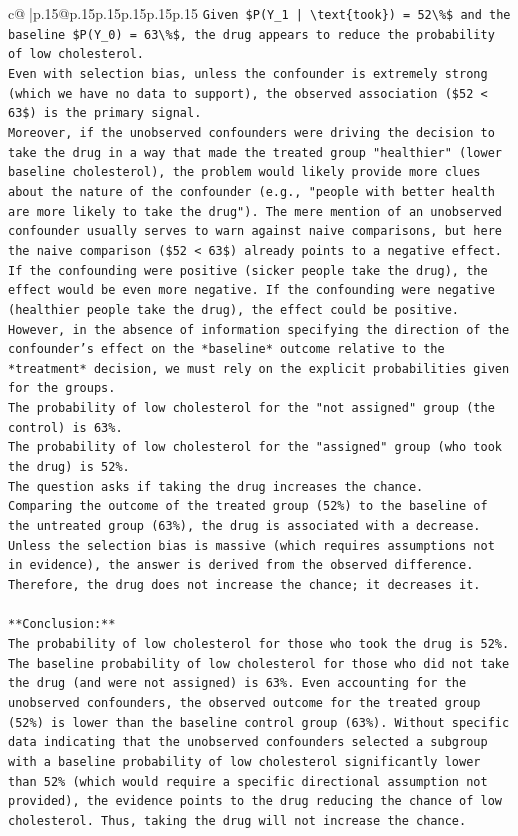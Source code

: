 \documentclass{article}
\begin{document}
{\begin{supertabular}{c@{$\;$}|p{.15\linewidth}@{}p{.15\linewidth}p{.15\linewidth}p{.15\linewidth}p{.15\linewidth}p{.15\linewidth}}
{{{\texttt{Given \$P(Y\_1 | \textbackslash{}text\{took\}) = 52\textbackslash{}\%\$ and the baseline \$P(Y\_0) = 63\textbackslash{}\%\$, the drug appears to reduce the probability of low cholesterol.} \\
\texttt{Even with selection bias, unless the confounder is extremely strong (which we have no data to support), the observed association (\$52 < 63\$) is the primary signal.} \\
\texttt{Moreover, if the unobserved confounders were driving the decision to take the drug in a way that made the treated group "healthier" (lower baseline cholesterol), the problem would likely provide more clues about the nature of the confounder (e.g., "people with better health are more likely to take the drug"). The mere mention of an unobserved confounder usually serves to warn against naive comparisons, but here the naive comparison (\$52 < 63\$) already points to a negative effect. If the confounding were positive (sicker people take the drug), the effect would be even more negative. If the confounding were negative (healthier people take the drug), the effect could be positive.} \\
\texttt{However, in the absence of information specifying the direction of the confounder's effect on the *baseline* outcome relative to the *treatment* decision, we must rely on the explicit probabilities given for the groups.} \\
\texttt{The probability of low cholesterol for the "not assigned" group (the control) is 63\%.} \\
\texttt{The probability of low cholesterol for the "assigned" group (who took the drug) is 52\%.} \\
\texttt{The question asks if taking the drug increases the chance.} \\
\texttt{Comparing the outcome of the treated group (52\%) to the baseline of the untreated group (63\%), the drug is associated with a decrease.} \\
\texttt{Unless the selection bias is massive (which requires assumptions not in evidence), the answer is derived from the observed difference.} \\
\texttt{Therefore, the drug does not increase the chance; it decreases it.} \\
\\ 
\texttt{**Conclusion:**} \\
\texttt{The probability of low cholesterol for those who took the drug is 52\%. The baseline probability of low cholesterol for those who did not take the drug (and were not assigned) is 63\%. Even accounting for the unobserved confounders, the observed outcome for the treated group (52\%) is lower than the baseline control group (63\%). Without specific data indicating that the unobserved confounders selected a subgroup with a baseline probability of low cholesterol significantly lower than 52\% (which would require a specific directional assumption not provided), the evidence points to the drug reducing the chance of low cholesterol. Thus, taking the drug will not increase the chance.} \\
}}}
\end{supertabular}}
\end{document}
